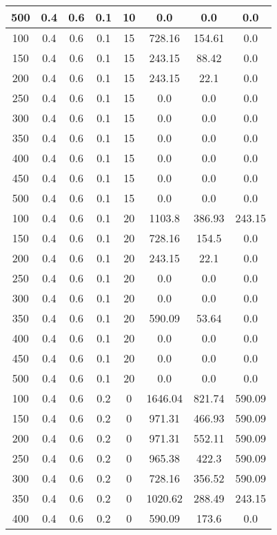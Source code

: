 \documentclass[a4paper, 12pt]{extreport}
\begin{document}
\begin{itemize}
\begin{longtable}{|c|c|c|c|c|c|c|c|}
			500 & 0.4 & 0.6 & 0.1 & 10 & 0.0 & 0.0 & 0.0 \\\hline
			100 & 0.4 & 0.6 & 0.1 & 15 & 728.16 & 154.61 & 0.0 \\\hline
			150 & 0.4 & 0.6 & 0.1 & 15 & 243.15 & 88.42 & 0.0 \\\hline
			200 & 0.4 & 0.6 & 0.1 & 15 & 243.15 & 22.1 & 0.0 \\\hline
			250 & 0.4 & 0.6 & 0.1 & 15 & 0.0 & 0.0 & 0.0 \\\hline
			300 & 0.4 & 0.6 & 0.1 & 15 & 0.0 & 0.0 & 0.0 \\\hline
			350 & 0.4 & 0.6 & 0.1 & 15 & 0.0 & 0.0 & 0.0 \\\hline
			400 & 0.4 & 0.6 & 0.1 & 15 & 0.0 & 0.0 & 0.0 \\\hline
			450 & 0.4 & 0.6 & 0.1 & 15 & 0.0 & 0.0 & 0.0 \\\hline
			500 & 0.4 & 0.6 & 0.1 & 15 & 0.0 & 0.0 & 0.0 \\\hline
			100 & 0.4 & 0.6 & 0.1 & 20 & 1103.8 & 386.93 & 243.15 \\\hline
			150 & 0.4 & 0.6 & 0.1 & 20 & 728.16 & 154.5 & 0.0 \\\hline
			200 & 0.4 & 0.6 & 0.1 & 20 & 243.15 & 22.1 & 0.0 \\\hline
			250 & 0.4 & 0.6 & 0.1 & 20 & 0.0 & 0.0 & 0.0 \\\hline
			300 & 0.4 & 0.6 & 0.1 & 20 & 0.0 & 0.0 & 0.0 \\\hline
			350 & 0.4 & 0.6 & 0.1 & 20 & 590.09 & 53.64 & 0.0 \\\hline
			400 & 0.4 & 0.6 & 0.1 & 20 & 0.0 & 0.0 & 0.0 \\\hline
			450 & 0.4 & 0.6 & 0.1 & 20 & 0.0 & 0.0 & 0.0 \\\hline
			500 & 0.4 & 0.6 & 0.1 & 20 & 0.0 & 0.0 & 0.0 \\\hline
			100 & 0.4 & 0.6 & 0.2 & 0 & 1646.04 & 821.74 & 590.09 \\\hline
			150 & 0.4 & 0.6 & 0.2 & 0 & 971.31 & 466.93 & 590.09 \\\hline
			200 & 0.4 & 0.6 & 0.2 & 0 & 971.31 & 552.11 & 590.09 \\\hline
			250 & 0.4 & 0.6 & 0.2 & 0 & 965.38 & 422.3 & 590.09 \\\hline
			300 & 0.4 & 0.6 & 0.2 & 0 & 728.16 & 356.52 & 590.09 \\\hline
			350 & 0.4 & 0.6 & 0.2 & 0 & 1020.62 & 288.49 & 243.15 \\\hline
			400 & 0.4 & 0.6 & 0.2 & 0 & 590.09 & 173.6 & 0.0 \\\hline

\end{longtable}
\end{itemize}
\end{document}
